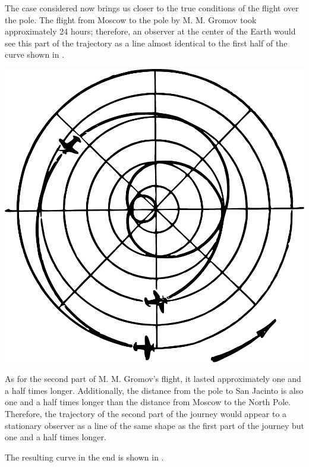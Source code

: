 The case considered now brings us closer to the true conditions of the flight over the pole. The flight from Moscow to the pole by M. M. Gromov took approximately 24 hours; therefore, an observer at the center of the Earth would see this part of the trajectory as a line almost identical to the first half of the curve shown in . 

\begin{marginfigure}[-2cm]%
\centering
\includegraphics[width=\textwidth]{figures/ch-09/fig-138.pdf}
\end{marginfigure}


As for the second part of M. M. Gromov's flight, it lasted approximately one and a half times longer. Additionally, the distance from the pole to San Jacinto is also one and a half times longer than the distance from Moscow to the North Pole. Therefore, the trajectory of the second part of the journey would appear to a stationary observer as a line of the same shape as the first part of the journey but one and a half times longer.




The resulting curve in the end is shown in .


